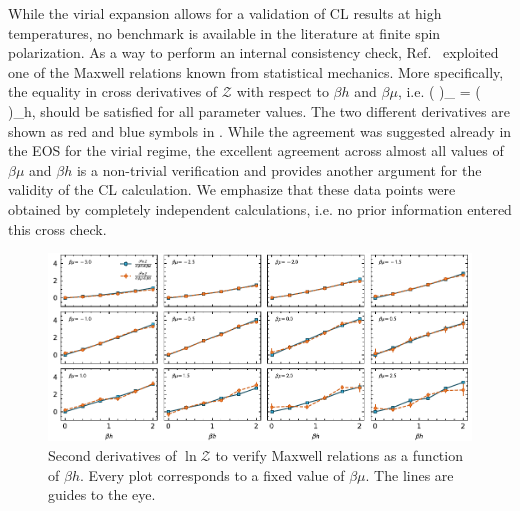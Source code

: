 \documentclass[../main.tex]{subfiles}
\begin{document}
%
While the virial expansion allows for a validation of CL results at high temperatures, no benchmark is available in the literature at finite spin polarization. As a way to perform an internal consistency check, Ref.~\cite{2018UFGviaCL} exploited one of the Maxwell relations known from statistical mechanics. More specifically, the equality in cross derivatives of $\mathcal Z$ with respect to $\beta h$ and $\beta \mu$, i.e.
%
\beq
\left(  \right)_{\beta\mu} = \left(  \right)_{\beta h},
\eeq
%
should be satisfied for all parameter values. The two different derivatives are shown as red and blue symbols in . While the agreement was suggested already in the EOS for the virial regime, the excellent agreement across almost all values of $\beta\mu$ and $\beta h$ is a non-trivial verification and provides another argument for the validity of the CL calculation. We emphasize that these data points were obtained by completely independent calculations, i.e. no prior information entered this cross check.
%
\begin{figure}
  \centering
  \includegraphics[width=\columnwidth]{./5applications-NREL/ufg_maxwell.pdf}
  \caption{\label{fig:ufg_maxwell} Second derivatives of $\ln\mathcal{Z}$ to verify Maxwell relations as a function of $\beta h$. Every plot corresponds to a fixed value of $\beta\mu$. The lines are guides to the eye.}
\end{figure}


\end{document}
